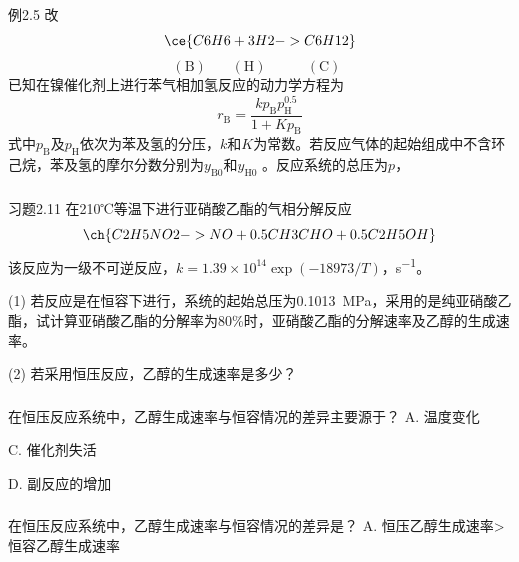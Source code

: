 \begin{frame}[t]{}
    \begin{redblock}{例2.5 改}
        $$\ce{C6H6 + 3H2 -> C6H12}$$
    $$(\mathrm{B})~~~~~~~~(\mathrm{H})~~~~~~~~~~~~~(\mathrm{C})~~$$
    已知在镍催化剂上进行苯气相加氢反应的动力学方程为
    \[
        r_\mathrm{B}=\frac{kp_\mathrm{B}p_\mathrm{H}^{0.5}}{1+Kp_\mathrm{B}}
    \]
    式中$p_\mathrm{B}$及$p_\mathrm{H}$依次为苯及氢的分压，$k$和$K$为常数。若反应气体的起始组成中不含环己烷，苯及氢的摩尔分数分别为$y_\mathrm{B0}$和$y_\mathrm{H0}$  。反应系统的总压为$p$，
    
    \end{redblock}
\end{frame}


\begin{frame}[t]
    \frametitle{}
    \begin{block}{习题2.11}
        在210℃等温下进行亚硝酸乙酯的气相分解反应
        \[
            \ch{C2H5NO2 -> NO + 0.5 CH3CHO + 0.5 C2H5OH}
        \]
        该反应为一级不可逆反应，$k = 1.39\times 10^{14}\exp(-18973/T)$，\si{s^{-1}}。
        
        (1) 若反应是在恒容下进行，系统的起始总压为\SI{0.1013}{MPa}，采用的是纯亚硝酸乙酯，试计算亚硝酸乙酯的分解率为80\%时，亚硝酸乙酯的分解速率及乙醇的生成速率。

        (2) 若采用恒压反应，乙醇的生成速率是多少？
    \end{block}
\end{frame}


\begin{frame}[t]
    \frametitle{}
    \begin{question}
        在恒压反应系统中，乙醇生成速率与恒容情况的差异主要源于？
        \tcblower
        A. 温度变化


        C. 催化剂失活

        D. 副反应的增加
    \end{question}
\end{frame}


\begin{frame}[t]
    \frametitle{}
    \begin{question}
        在恒压反应系统中，乙醇生成速率与恒容情况的差异是？
        \tcblower
        A. 恒压乙醇生成速率>恒容乙醇生成速率

    \end{question}
\end{frame}


